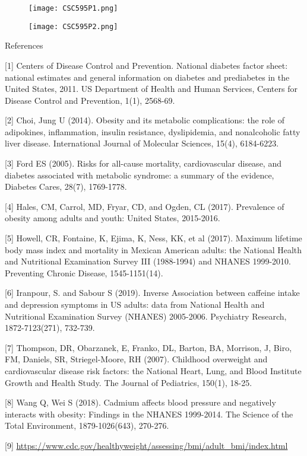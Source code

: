 \documentclass[12pt]{article}
\numberwithin{figure}{section}
\begin{document}
\newpage
 \begin{figure}[!hb]
\begin{center}
\texttt{[image: CSC595P1.png]}
\end{center}
\end{figure}

\newpage
 \begin{figure}[!hb]
\begin{center}
\texttt{[image: CSC595P2.png]}
\end{center}
\end{figure}
 \newpage



\newpage
\newpage

{\sf References}

[1] Centers of Disease Control and Prevention. National diabetes factor sheet: national estimates and general information on diabetes and prediabetes in the United States, 2011. US Department of Health and Human Services, Centers for Disease Control and Prevention, 1(1), 2568-69.

[2] Choi, Jung U (2014). Obesity and its metabolic complications: the role of adipokines, inflammation, insulin resistance, dyslipidemia, and nonalcoholic fatty liver disease.  International Journal of Molecular Sciences, 15(4), 6184-6223.

[3] Ford ES (2005). Risks for all-cause mortality, cardiovascular disease, and diabetes associated with metabolic syndrome: a summary of the evidence, Diabetes Cares, 28(7), 1769-1778.

[4] Hales, CM, Carrol, MD, Fryar, CD, and Ogden, CL (2017). Prevalence of obesity among adults and youth: United States, 2015-2016.

[5] Howell, CR, Fontaine, K, Ejima, K, Ness, KK, et al (2017). Maximum lifetime body mass index and mortality in Mexican American adults: the National Health and Nutritional Examination Survey III (1988-1994) and NHANES 1999-2010. Preventing Chronic Disease, 1545-1151(14).

[6] Iranpour, S. and Sabour S (2019). Inverse Association between caffeine intake and depression symptoms in US adults: data from National Health and Nutritional Examination Survey (NHANES) 2005-2006. Psychiatry Research, 1872-7123(271), 732-739.

[7] Thompson, DR, Obarzanek, E, Franko, DL, Barton, BA, Morrison, J, Biro, FM, Daniels, SR, Striegel-Moore, RH (2007).  Childhood overweight and cardiovascular disease risk factors: the National Heart, Lung, and Blood Institute Growth and Health Study. The Journal of Pediatrics, 150(1), 18-25.

[8] Wang Q, Wei S (2018). Cadmium affects blood pressure and negatively interacts with obesity: Findings in the NHANES 1999-2014. The Science of the Total Environment, 1879-1026(643), 270-276.

[9] \url{https://www.cdc.gov/healthyweight/assessing/bmi/adult_bmi/index.html}
\end{document}
